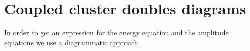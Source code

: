 \documentclass[
    a4paper, aps, twocolumn, floatfix, superscriptaddress,
    nofootinbib]{revtex4-1}
\newcommand{\1}{\mathds{1}}
\begin{document}
\section{Coupled cluster doubles diagrams}
    In order to get an expression for the energy equation and the amplitude
    equations we use a diagrammatic approach.



\end{document}
